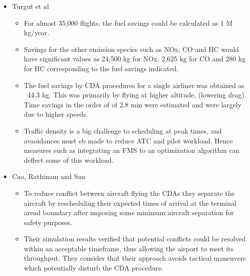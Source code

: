 \documentclass{aer1315-pretty}
\begin{document}
\begin{itemize}
\item Turgut et al \cite{Enis:2010}

\begin{itemize}
\item For almost 35,000 flights, the fuel savings could be calculated as 1 M kg/year.
\item Savings for the other emission species such as NOx, CO and HC would have significant values as 24,500 kg for NOx, 2,625 kg for CO and 280 kg for HC corresponding to the fuel savings indicated.
\item The fuel savings by CDA procedures for a single airliner was obtained as ~44.3 kg. This was primarily by flying at higher altitude, (lowering drag). Time savings in the order of  of 2.8 min were estimated and were largely due to higher speeds.  
\item Traffic density is a big challenge to scheduling at peak times, and avaoidances must eb made to reduce ATC and pilot workload. Hence measures such as integrating an FMS to an optimization algorithm can deflect some of this workload.
\end{itemize}


\item Cao, Rathinam and Sun \cite{Cao:2011} 
\begin{itemize}
\item  To reduce conflict between aircraft flying the CDAs they separate the aircraft by rescheduling their expected times of arrival at the terminal aread boundary after imposing some minimum aircraft separation for safety purposes.
\item Their simulation results verified that potential conflicts could be resolved within an acceptable timeframe, thus allowing the airport to meet its throughput. They consider that their approach avoids tactical maneuvers which potentially disturb the CDA procedure. 
\end{itemize}



\end{itemize}
\end{document}
